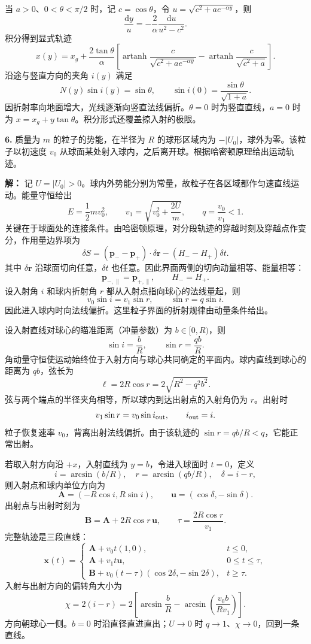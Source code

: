 \documentclass[11pt,a4paper]{ctexart}
\begin{document}
当 $a>0$、$0<\theta<\pi/2$ 时，记 $c=\cos\theta$，令 $u=\sqrt{c^2+ae^{-\alpha y}}$，则
\[
\frac{\mathrm dy}{u}=-\frac2\alpha\frac{\mathrm du}{u^2-c^2}.
\]
积分得到显式轨迹
\[
{x(y)=x_g+\frac{2\tan\theta}{\alpha}
\left[\operatorname{artanh}\frac{c}{\sqrt{c^2+ae^{-\alpha y}}}
-\operatorname{artanh}\frac{c}{\sqrt{c^2+a}}\right]}.
\]
沿途与竖直方向的夹角 $i(y)$ 满足
\[
{N(y)\sin i(y)=\sin\theta},\qquad
\sin i(0)=\frac{\sin\theta}{\sqrt{1+a}}.
\]
因折射率向地面增大，光线逐渐向竖直法线偏折。$\theta=0$ 时为竖直直线，$a=0$ 时为 $x=x_g+y\tan\theta$。积分形式还覆盖掠入射的极限。

\noindent\textbf{6.} 质量为 $m$ 的粒子的势能，在半径为 $R$ 的球形区域内为 $-|U_0|$，球外为零。该粒子以初速度 $v_0$ 从球面某处射入球内，之后离开球。根据哈密顿原理给出运动轨迹。

\textbf{解：} 记 $U=|U_0|>0$。球内外势能分别为常量，故粒子在各区域都作匀速直线运动。能量守恒给出
\[
E=\frac12mv_0^2,\qquad
v_1=\sqrt{v_0^2+\frac{2U}{m}},\qquad
q=\frac{v_0}{v_1}<1.
\]
关键在于球面处的连接条件。由哈密顿原理，对分段轨迹的穿越时刻及穿越点作变分，作用量边界项为
\[
\delta S=(\bm p_- -\bm p_+)\cdot\delta\bm r
-(H_- -H_+)\delta t.
\]
其中 $\delta\bm r$ 沿球面切向任意，$\delta t$ 也任意。因此界面两侧的切向动量相等、能量相等：
\[
\bm p_{-,\parallel}=\bm p_{+,\parallel},\qquad H_-=H_+.
\]
设入射角 $i$ 和球内折射角 $r$ 都从入射点指向球心的法线量起，则
\[
{v_0\sin i=v_1\sin r},\qquad
{\sin r=q\sin i}.
\]
因此进入球内时向法线偏折。这里粒子界面的折射规律由动量条件给出。

设入射直线对球心的瞄准距离（冲量参数）为 $b\in[0,R)$，则
\[
\sin i=\frac bR,\qquad
\sin r=\frac{qb}{R}.
\]
角动量守恒使运动始终位于入射方向与球心共同确定的平面内。球内直线到球心的距离为 $qb$，弦长为
\[
\ell=2R\cos r=2\sqrt{R^2-q^2b^2}.
\]
弦与两个端点的半径夹角相等，所以球内到达出射点的入射角仍为 $r$。出射时
\[
v_1\sin r=v_0\sin i_{\rm out},
\qquad i_{\rm out}=i.
\]
粒子恢复速率 $v_0$，背离出射法线偏折。由于该轨迹的 $\sin r=qb/R<q$，它能正常出射。

若取入射方向沿 $+x$，入射直线为 $y=b$，令进入球面时 $t=0$，定义
\[
i=\arcsin(b/R),\quad r=\arcsin(qb/R),\quad\delta=i-r,
\]
则入射点和球内单位方向为
\[
\bm A=(-R\cos i,R\sin i),\qquad
\bm u=(\cos\delta,-\sin\delta).
\]
出射点与出射时刻为
\[
\bm B=\bm A+2R\cos r\,\bm u,\qquad
\tau=\frac{2R\cos r}{v_1}.
\]
完整轨迹是三段直线：
\[
{\bm x(t)=\begin{cases}
\bm A+v_0t(1,0),&t\le0,\\
\bm A+v_1t\bm u,&0\le t\le\tau,\\
\bm B+v_0(t-\tau)(\cos2\delta,-\sin2\delta),&t\ge\tau.
\end{cases}}
\]
入射与出射方向的偏转角大小为
\[
{\chi=2(i-r)=2\left[\arcsin\frac bR-
\arcsin\left(\frac{v_0b}{Rv_1}\right)\right]}.
\]
方向朝球心一侧。$b=0$ 时沿直径直进直出；$U\to0$ 时 $q\to1$、$\chi\to0$，回到一条直线。
\end{document}
